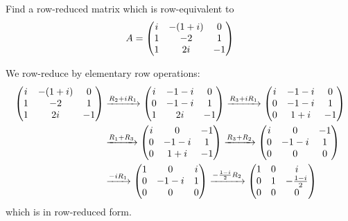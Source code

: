 \begin{xca}
  Find a row-reduced matrix which is row-equivalent to
  \[ A = \mqty(i&-(1+i)&0 \\ 1&-2&1 \\ 1&2i&-1) \]
\end{xca}
\begin{sol}
  We row-reduce by elementary row operations:
  \begin{equation*}
    \begin{split}
      \mqty(i&-(1+i)&0 \\ 1&-2&1 \\ 1&2i&-1)
      & \xto{R_2 + iR_1} \mqty(i&-1-i&0 \\ 0&-1-i&1 \\ 1&2i&-1)
      \xto{R_3 + iR_1} \mqty(i&-1-i&0 \\ 0&-1-i&1 \\ 0&1+i&-1) \\
      & \xto{R_1 + R_3} \mqty(i&0&-1 \\ 0&-1-i&1 \\ 0&1+i&-1)
      \xto{R_3 + R_2} \mqty(i&0&-1 \\ 0&-1-i&1 \\ 0&0&0) \\
      & \xto{-iR_1} \mqty(1&0&i \\ 0&-1-i&1 \\ 0&0&0)
      \xto{-\frac{1-i}{2}R_2} \mqty(1&0&i \\ 0&1&-\frac{1-i}{2} \\ 0&0&0)
    \end{split}
  \end{equation*}
  which is in row-reduced form.
\end{sol}

